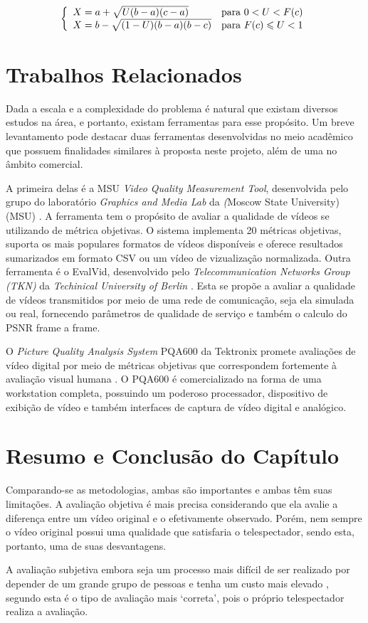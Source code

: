 \[\left\{\begin{array}{l l}
X = a +\sqrt{U(b-a)(c-a)} & \mbox{para } 0 < U < F(c)\\ 
X = b - \sqrt{(1-U)(b-a)(b-c)} & \mbox{para } F(c) \leqslant U < 1
\end{array}\right.\]

\section{Trabalhos Relacionados}

Dada a escala e a complexidade do problema é natural que existam diversos estudos na área, e portanto, existam ferramentas para esse propósito. 
Um breve levantamento pode destacar duas ferramentas desenvolvidas no meio acadêmico que possuem finalidades similares à proposta neste projeto, além de uma no âmbito comercial.

A primeira delas é a MSU \emph{Video Quality Measurement Tool}, desenvolvida pelo grupo do laboratório \emph{Graphics and Media Lab} da \emph(Moscow State University) (MSU) \cite{moscowuniversity}.
A ferramenta tem o propósito de avaliar a qualidade de vídeos se utilizando de métrica objetivas. 
O sistema implementa 20 métricas objetivas, suporta os mais populares formatos de vídeos disponíveis e oferece resultados sumarizados em formato CSV ou um vídeo de vizualização normalizada.
Outra ferramenta é o EvalVid, desenvolvido pelo \emph{Telecommunication Networks Group (TKN)} da \emph{Techinical University of Berlin} \cite{tuberlin}.
Esta se propõe a avaliar a qualidade de vídeos transmitidos por meio de uma rede de comunicação, seja ela simulada ou real, fornecendo parâmetros de qualidade de serviço e também o calculo do PSNR frame a frame.

O \emph{Picture Quality Analysis System} PQA600 da Tektronix promete avaliações de vídeo digital por meio de métricas objetivas que correspondem fortemente à avaliação visual humana \cite{tektronix}.
O PQA600 é comercializado na forma de uma workstation completa, possuindo um poderoso processador, dispositivo de exibição de vídeo e também interfaces de captura de vídeo digital e analógico.

\section{Resumo e Conclusão do Capítulo}

Comparando-se as metodologias, ambas são importantes e ambas têm suas limitações. A avaliação objetiva é mais precisa considerando que ela avalie a diferença entre um vídeo original e o efetivamente observado. Porém, nem sempre o vídeo original possui uma qualidade que satisfaria o telespectador, sendo esta, portanto, uma de suas desvantagens.

A avaliação subjetiva embora seja um processo mais difícil de ser realizado por depender de um grande grupo de pessoas e tenha um custo mais elevado \cite{albini}, segundo \cite{wangbovik2004} esta é o tipo de avaliação mais ‘correta’, pois o próprio telespectador realiza a avaliação.
